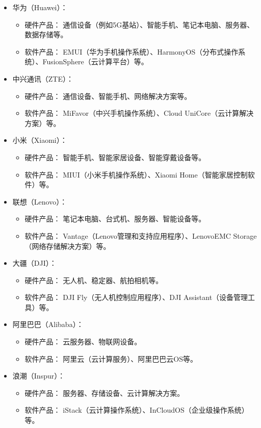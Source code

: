 \documentclass[11pt, a4paper, oneside]{ctexbook}
\begin{document}
\begin{itemize}
    \item 华为（Huawei）：
    \begin{itemize}
        \item 硬件产品： 通信设备（例如5G基站）、智能手机、笔记本电脑、服务器、数据存储等。
        \item 软件产品： EMUI（华为手机操作系统）、HarmonyOS（分布式操作系统）、FusionSphere（云计算平台）等。
    \end{itemize}
    \item 中兴通讯（ZTE）：
    \begin{itemize}
        \item 硬件产品： 通信设备、智能手机、网络解决方案等。
        \item 软件产品： MiFavor（中兴手机操作系统）、Cloud UniCore（云计算解决方案）等。
    \end{itemize}
    \item 小米（Xiaomi）：
    \begin{itemize}
        \item 硬件产品： 智能手机、智能家居设备、智能穿戴设备等。
        \item 软件产品： MIUI（小米手机操作系统）、Xiaomi Home（智能家居控制软件）等。
    \end{itemize}
    \item 联想（Lenovo）：
    \begin{itemize}
        \item 硬件产品： 笔记本电脑、台式机、服务器、智能设备等。
        \item 软件产品： Vantage（Lenovo管理和支持应用程序）、LenovoEMC Storage（网络存储解决方案）等。
    \end{itemize}
    \item 大疆（DJI）：
    \begin{itemize}
        \item 硬件产品： 无人机、稳定器、航拍相机等。
        \item 软件产品： DJI Fly（无人机控制应用程序）、DJI Assistant（设备管理工具）等。
    \end{itemize}
    \item 阿里巴巴（Alibaba）：
    \begin{itemize}
        \item 硬件产品： 云服务器、物联网设备。
        \item 软件产品： 阿里云（云计算服务）、阿里巴巴云OS等。
    \end{itemize}
    \item 浪潮（Inspur）：
    \begin{itemize}
        \item 硬件产品： 服务器、存储设备、云计算解决方案。
        \item 软件产品： iStack（云计算操作系统）、InCloudOS（企业级操作系统）等。
    \end{itemize}
\end{itemize}
\end{document}
